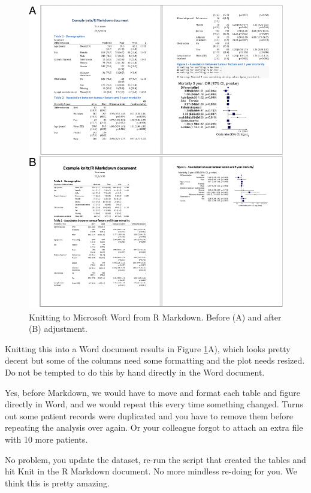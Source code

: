 \documentclass[
  12pt,
  krantz2]{krantz}
\begin{document}
\begin{figure}
\centering
\includegraphics{images/chapter13/1_word_knit.pdf}
\caption{\label{fig:chap13-fig-word}Knitting to Microsoft Word from R Markdown. Before (A) and after (B) adjustment.}
\end{figure}

Knitting this into a Word document results in Figure \ref{fig:chap13-fig-word}A), which looks pretty decent but some of the columns need some formatting and the plot needs resized.
Do not be tempted to do this by hand directly in the Word document.

Yes, before Markdown, we would have to move and format each table and figure directly in Word, and we would repeat this every time something changed.
Turns out some patient records were duplicated and you have to remove them before repeating the analysis over again.
Or your colleague forgot to attach an extra file with 10 more patients.

No problem, you update the dataset, re-run the script that created the tables and hit Knit in the R Markdown document.
No more mindless re-doing for you.
We think this is pretty amazing.
\end{document}
